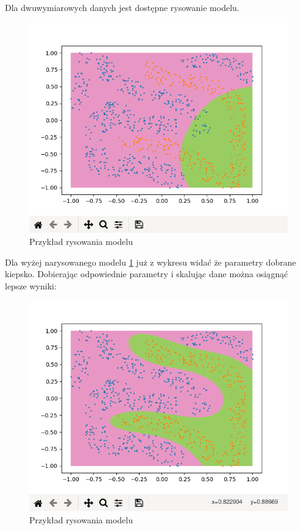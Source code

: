 \documentclass[paper=a4, fontsize=11pt]{scrartcl} %
\numberwithin{equation}{section} %
\numberwithin{figure}{section} %
\begin{document}
    \par Dla dwuwymiarowych danych jest dostępne rysowanie modelu.

    \begin{figure}[H]
        \begin{center}
            \includegraphics[scale=0.65]{./img/2dplot_model1.png}
            \caption{Przykład rysowania modelu}
            \label{fig:bad_model_visualization}
        \end{center}
    \end{figure}

    \newpage
    \par Dla wyżej narysowanego modelu \ref{fig:bad_model_visualization} już z wykresu widać że
    parametry dobrane kiepsko.  Dobierając odpowiednie parametry i skalując dane można osiągnąć
    lepsze wyniki:

    \begin{figure}[H]
        \begin{center}
            \includegraphics[scale=0.65]{./img/2dplot_model2.png}
            \caption{Przykład rysowania modelu}
            \label{fig:good_model_visualization}
        \end{center}
    \end{figure}
\end{document}
